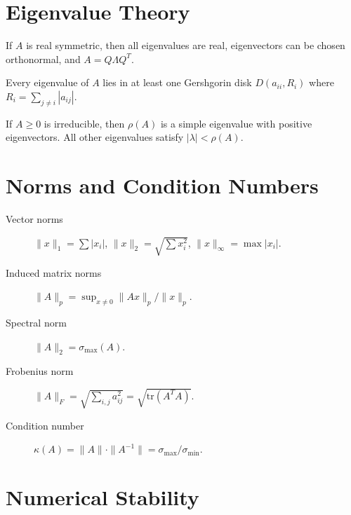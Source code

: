 \section{Eigenvalue Theory}
\label{app:linalg:eigen}

\begin{theorem}
If $A$ is real symmetric, then all eigenvalues are real, eigenvectors can be chosen orthonormal, and $A = Q\Lambda Q^T$.
\end{theorem}

\begin{theorem}
Every eigenvalue of $A$ lies in at least one Gershgorin disk $D(a_{ii}, R_i)$ where $R_i = \sum_{j \neq i} |a_{ij}|$.
\end{theorem}

\begin{theorem}
If $A \geq 0$ is irreducible, then $\rho(A)$ is a simple eigenvalue with positive eigenvectors. All other eigenvalues satisfy $|\lambda| < \rho(A)$.
\end{theorem}

\section{Norms and Condition Numbers}
\label{app:linalg:norms}

\begin{description}
    \item[Vector norms] $\|x\|_1 = \sum |x_i|$, $\|x\|_2 = \sqrt{\sum x_i^2}$, $\|x\|_\infty = \max |x_i|$.
    \item[Induced matrix norms] $\|A\|_p = \sup_{x \neq 0} \|Ax\|_p / \|x\|_p$.
    \item[Spectral norm] $\|A\|_2 = \sigma_{\max}(A)$.
    \item[Frobenius norm] $\|A\|_F = \sqrt{\sum_{i,j} a_{ij}^2} = \sqrt{\text{tr}(A^TA)}$.
    \item[Condition number] $\kappa(A) = \|A\| \cdot \|A^{-1}\| = \sigma_{\max}/\sigma_{\min}$.
\end{description}


\section{Numerical Stability}
\label{app:linalg:stability}

